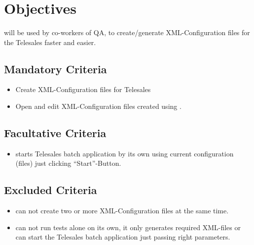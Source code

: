 \section{Objectives}

\paragraph{}\app{} will be used by co-workers of QA, to create/generate XML-Configuration files for the Telesales faster and easier.

\subsection{Mandatory Criteria}

\begin{itemize}
\item Create XML-Configuration files for Telesales
\item Open and edit XML-Configuration files created using \app{}.
\end{itemize}

\subsection{Facultative Criteria}

\begin{itemize}
\item \app{} starts Telesales batch application by its own using current configuration (files) just clicking ``Start''-Button.
\end{itemize}

\subsection{Excluded Criteria}

\begin{itemize}
\item \app{} can not create two or more XML-Configuration files at the same time.
\item \app{} can not run tests alone on its own, it only generates required XML-files or can start the Telesales batch application just passing right parameters.
\end{itemize}
